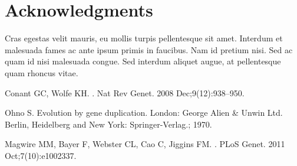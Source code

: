\documentclass[10pt,letterpaper]{article}
\begin{document}
\section*{Acknowledgments}
Cras egestas velit mauris, eu mollis turpis pellentesque sit amet. Interdum et malesuada fames ac ante ipsum primis in faucibus. Nam id pretium nisi. Sed ac quam id nisi malesuada congue. Sed interdum aliquet augue, at pellentesque quam rhoncus vitae.

\nolinenumbers

%
%
%
\begin{thebibliography}{10}

Conant GC, Wolfe KH.
.
\newblock Nat Rev Genet. 2008 Dec;9(12):938--950.

Ohno S.
\newblock Evolution by gene duplication.
\newblock London: George Alien \& Unwin Ltd. Berlin, Heidelberg and New York:
  Springer-Verlag.; 1970.

Magwire MM, Bayer F, Webster CL, Cao C, Jiggins FM.
.
\newblock PLoS Genet. 2011 Oct;7(10):e1002337.

\end{thebibliography}
\end{document}
